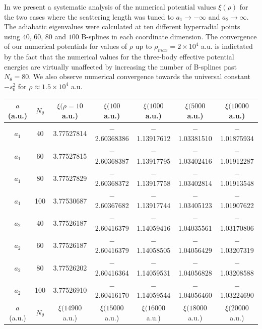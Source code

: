 In  we present a systematic analysis of the numerical potential values $\xi(\rho)$ for the two cases where the scattering length was tuned to $a_1 \rightarrow -\infty$ and $a_2 \rightarrow \infty$. The adiabatic eigenvalues were calculated at ten different hyperradial points using $40$, $60$, $80$ and $100$ B-splines in each coordinate dimension. The convergence of our numerical potentials for values of $\rho$ up to $\rho_{max} = 2 \times 10^4$ a.u. is indictated by the fact that the numerical values for the three-body effective potential energies are virtually unaffected by increasing the number of B-splines past $N_{\theta}=80$. We also observe numerical convergence towards the universal constant $-s_0^2$ for $\rho \approx 1.5 \times 10^4$ a.u. 

\begin{table}[h!]
	\centering
	\footnotesize
	\begin{adjustwidth}{-0.1cm}{}
		\tabcolsep=0.10cm
		\begin{tabular}{||c c c c c c c||} 
			\hline
			$a$ (a.u.) & $N_{\theta}$ & $\xi(\rho = 10 $ a.u.) & $\xi(100 $ a.u.) & $\xi(1000 $ a.u.) & $\xi(5000 $ a.u.) & $\xi(10000 $ a.u.)  \Tstrut\Bstrut \\ [0.7ex]
			\hline\hline  \Tstrut\Bstrut 
			$a_1$   & 40  & 3.77527814 & $-$2.60368386 & $-$1.13917612 & $-$1.03381510& $-$1.01875934 \\
			$a_1$   & 60  & 3.77527815 & $-$2.60368387 & $-$1.13917795 & $-$1.03402416& $-$1.01912287\\
			$a_1$   & 80  & 3.77527829 & $-$2.60368372 & $-$1.13917758 & $-$1.03402814 & $-$1.01913548 \\
			$a_1$   & 100  & 3.77530687 & $-$2.60367682 & $-$1.13917744 & $-$1.03405123 & $-$1.01907622 \\ [0.5ex]
			\hline \Tstrut\Bstrut 
			$a_2$   & 40  & 3.77526187 & $-$2.60416379 & $-$1.14059416 & $-$1.04035561 & $-$1.03170806 \\
			$a_2$   & 60  & 3.77526187 & $-$2.60416379 & $-$1.14058505 & $-$1.04056429 & $-$1.03207319 \\
			$a_2$   & 80  & 3.77526202 & $-$2.60416364 & $-$1.14059531 & $-$1.04056828 & $-$1.03208588 \\
			$a_2$   & 100  & 3.77526910 & $-$2.60416170 & $-$1.14059544 & $-$1.04056460 & $-$1.03224690 \\ [0.7ex] 
			\hline
			\hline
			$a$ (a.u.) & $N_{\theta}$ & $\xi(14900 $ a.u.) & $\xi(15000 $ a.u.) & $\xi(16000 $ a.u.) & $\xi(18000 $ a.u.) & $\xi(20000 $ a.u.)  \Tstrut\Bstrut \\ [0.7ex]

\end{tabular}
\end{adjustwidth}
\end{table}
